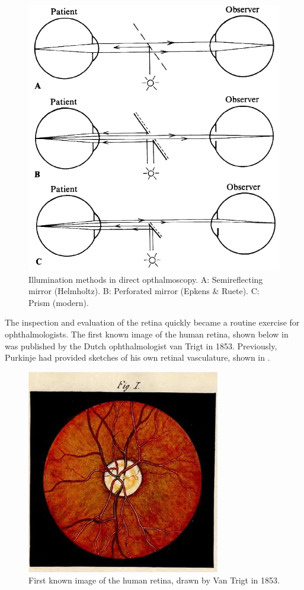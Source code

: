 \begin{figure}[htbp]
\centering
  \includegraphics{figures/illumination_methods}
\caption{Illumination methods in direct opthalmoscopy. A: Semireflecting mirror (Helmholtz). B: Perforated mirror (Epkens \& Ruete). C: Prism (modern).\cite{colenbrander2013principles}}
\label{fig:illum_methods}
\end{figure}


The inspection and evaluation of the retina quickly became a routine exercise for ophthalmologists.  The first known image of the human retina, shown below in  was published by the Dutch ophthalmologist van Trigt in 1853.  Previously, Purkinje had provided sketches of his own retinal vasculature, shown in .


\begin{figure}[htbp]
\centering
  \includegraphics{figures/first_human_retina}
\caption{First known image of the human retina, drawn by Van Trigt in 1853.\cite{van1853dissertatio}}
\label{fig:human_retina}
\end{figure}

